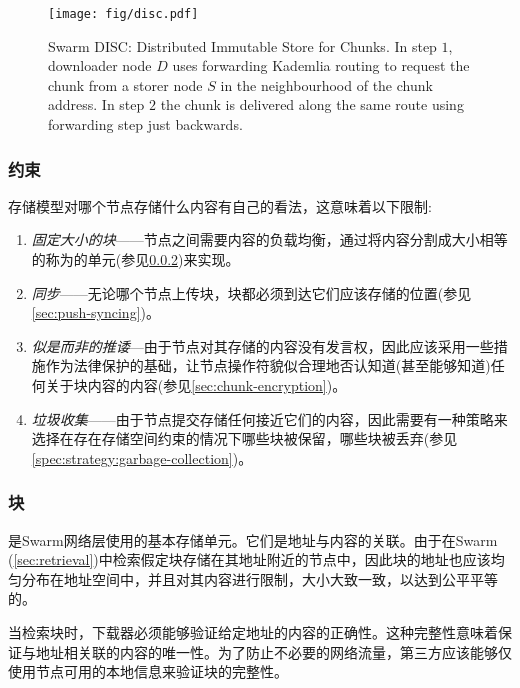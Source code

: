 \begin{figure}[htbp]
   \centering
   \texttt{[image: fig/disc.pdf]}
   \caption[Swarm DISC: Distributed Immutable Store for Chunks \statusgreen]{Swarm DISC:  Distributed Immutable Store for Chunks. In step $1$, downloader node $D$ uses forwarding Kademlia routing to request the chunk from a storer node $S$ in the neighbourhood of the chunk address. In step $2$ the chunk is delivered along the same route using forwarding step just backwards.   }
   \label{fig:disc}
\end{figure}

\subsubsection{约束}
存储模型对哪个节点存储什么内容有自己的看法，这意味着以下限制: 

\begin{enumerate}
    \item \emph{固定大小的块}——节点之间需要内容的负载均衡，通过将内容分割成大小相等的称为的单元(参见\ref{sec:chunks})来实现。
    \item \emph{同步}——无论哪个节点上传块，块都必须到达它们应该存储的位置(参见\ref{sec:push-syncing})。
    \item \emph{似是而非的推诿}—由于节点对其存储的内容没有发言权，因此应该采用一些措施作为法律保护的基础，让节点操作符貌似合理地否认知道(甚至能够知道)任何关于块内容的内容(参见\ref{sec:chunk-encryption})。
    \item \emph{垃圾收集}——由于节点提交存储任何接近它们的内容，因此需要有一种策略来选择在存在存储空间约束的情况下哪些块被保留，哪些块被丢弃(参见\ref{spec:strategy:garbage-collection})。 
\end{enumerate}

\subsubsection{块}\label{sec:chunks}

是Swarm网络层使用的基本存储单元。它们是地址与内容的关联。由于在Swarm (\ref{sec:retrieval})中检索假定块存储在其地址附近的节点中，因此块的地址也应该均匀分布在地址空间中，并且对其内容进行限制，大小大致一致，以达到公平平等的。  

当检索块时，下载器必须能够验证给定地址的内容的正确性。这种完整性意味着保证与地址相关联的内容的唯一性。为了防止不必要的网络流量，第三方应该能够仅使用节点可用的本地信息来验证块的完整性。

